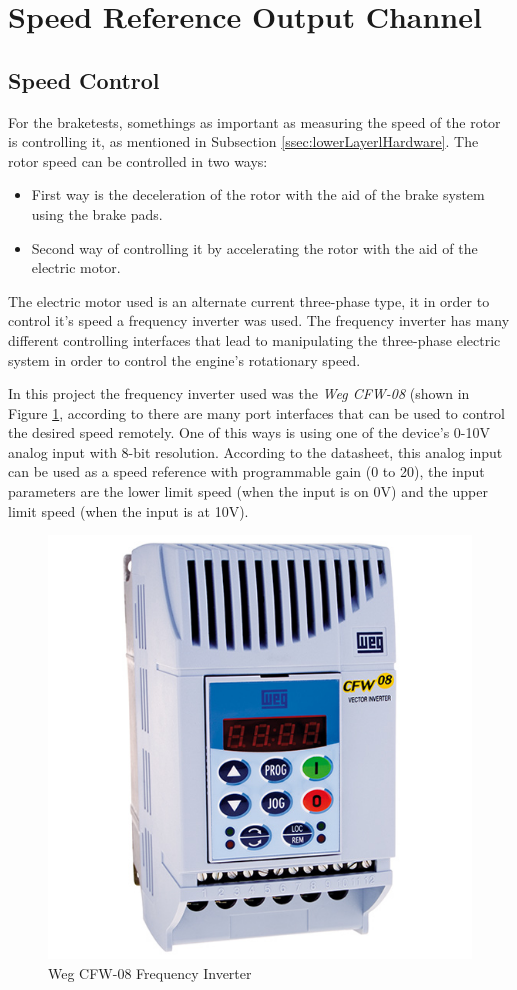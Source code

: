 	\section{Speed Reference Output Channel}\label{sec:speed-reference-output-channel}

	\subsection{Speed Control}\label{ssec:speed-control}
		\par
		For the braketests, somethings as important as measuring the speed of the rotor is controlling it, as mentioned in Subsection \ref{ssec:lowerLayerlHardware}. The rotor speed can be controlled in two ways:
			\begin{itemize}
				\item First way is the deceleration of the rotor with the aid of the brake system using the brake pads.
				\item Second way of controlling it by accelerating the rotor with the aid of the electric motor.
			\end{itemize}
		The electric motor used is an alternate current three-phase type, it in order to control it's speed a frequency inverter was used. The frequency inverter has many different controlling interfaces that lead to manipulating the three-phase electric system in order to control the engine's rotationary speed.
		\par
		In this project the frequency inverter used was the \textit{Weg CFW-08} (shown in Figure \ref{fig:wegCFW08}, according to \cite{wegCFW08Manual} there are many port interfaces that can be used to control the desired speed remotely. One of this ways is using one of the device's 0-10V analog input with 8-bit resolution. According to the datasheet, this analog input can be used as a speed reference with programmable gain (0 to 20), the input parameters are the lower limit speed (when the input is on 0V) and the upper limit speed (when the input is at 10V).

		\begin{figure}[htbp]
			\centering
				\includegraphics[width=.5\textwidth]{figuras/fig-wegCFW08}
			\caption{Weg CFW-08 Frequency Inverter \cite{fig-wegCFW08}}
			\label{fig:wegCFW08}
		\end{figure}

